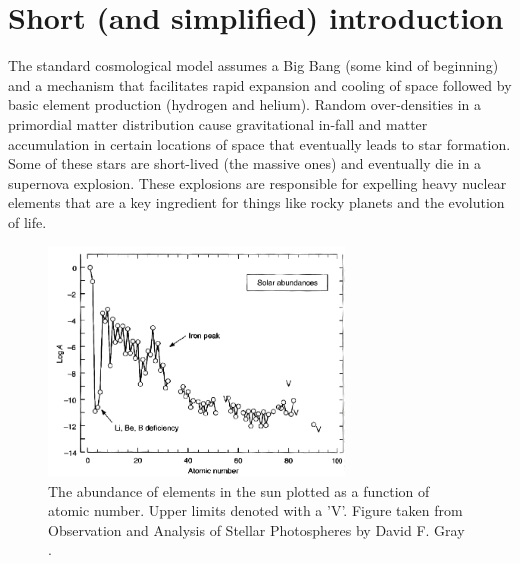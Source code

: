 \documentclass[a4paper,12pt]{article}
\theoremstyle{remark}
\renewcommand{\=}[1]{\stackrel{#1}{=}} %
\theoremstyle{plain}
\theoremstyle{definition}
\begin{document}
\section{Short (and simplified) introduction}
The standard cosmological model assumes a Big Bang (some kind of beginning) and a mechanism that facilitates rapid expansion and cooling of space followed by basic element production (hydrogen and helium). Random over-densities in a primordial matter distribution cause gravitational in-fall and matter accumulation in certain locations of space that eventually leads to star formation. Some of these stars are short-lived (the massive ones) and eventually die in a supernova explosion. These explosions are responsible for expelling heavy nuclear elements that are a key ingredient for things like rocky planets and the evolution of life. %

\begin{figure}[t]
\begin{center}
    \includegraphics*[angle=0,width=0.7\textwidth]{img/chemical_distribution3.png}
    \caption[Distribution of chemicals in the sun]{The abundance of elements in the sun plotted as a function of atomic number. Upper limits denoted with a 'V'. Figure taken from Observation and Analysis of Stellar Photospheres by David F. Gray \cite{Gray2005}.}
\label{fig:chemica_dist}
\end{center}
\end{figure}
\end{document}
